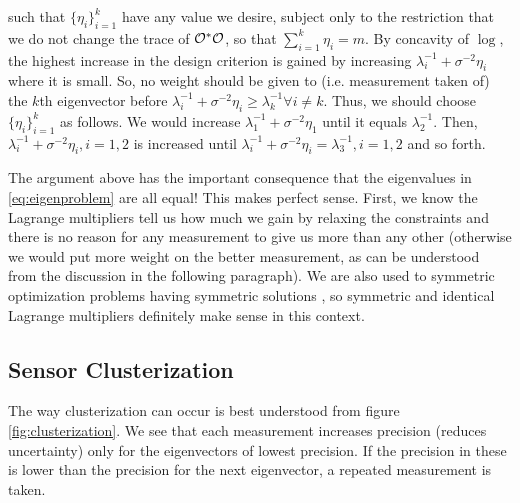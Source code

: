 \documentclass{amsart}
\numberwithin{equation}{section}
\begin{document}
such that $\{\eta_i\}_{i=1}^k$ have any value we desire, subject only
to the restriction that we do not change the trace of $\mathcal{O}^*\mathcal{O}$, so
that $\sum_{i=1}^k \eta_i = m$. By concavity of $\log$, the highest
increase in the design criterion is gained by increasing
$\lambda_i^{-1} + \sigma^{-2}\eta_i$ where it is small. So, no weight
should be given to (i.e. measurement taken of) the $k$th eigenvector
before $\lambda_i^{-1} + \sigma^{-2}\eta_i \geq \lambda_k^{-1} \forall
i \neq k$. Thus, we should choose $\{\eta_i\}_{i=1}^k$ as follows. We
would increase $\lambda_1^{-1} + \sigma^{-2} \eta_1$ until it equals
$\lambda_2^{-1}$. Then, $\lambda_i^{-1} + \sigma^{-2} \eta_i,i=1,2$ is
increased until $\lambda_i^{-1} + \sigma^{-2} \eta_i =
\lambda_3^{-1},i=1,2$ and so forth.

The argument above has the important consequence that the eigenvalues
in \eqref{eq:eigenproblem} are all equal! This makes perfect
sense. First, we know the Lagrange multipliers tell us how much we
gain by relaxing the constraints and there is no reason for any
measurement to give us more than any other (otherwise we would put
more weight on the better measurement, as can be understood from the
discussion in the following paragraph). We are also used to symmetric
optimization problems having symmetric solutions \cite{Waterhouse83},
so symmetric and identical Lagrange multipliers definitely make sense
in this context.

\subsection{Sensor Clusterization}\label{subsec:clusterization}
The way clusterization can occur is best understood from figure
\ref{fig:clusterization}. We see that each measurement increases
precision (reduces uncertainty) only for the eigenvectors of lowest
precision. If the precision in these is lower than the precision for
the next eigenvector, a repeated measurement is taken.
\end{document}
